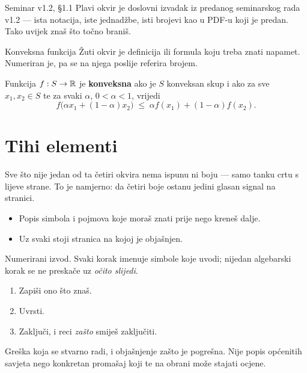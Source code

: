 \begin{seminar}{Seminar v1.2, §1.1}
Plavi okvir je doslovni izvadak iz predanog seminarskog rada v1.2 --- ista notacija,
iste jednadžbe, isti brojevi kao u PDF-u koji je predan. Tako uvijek znaš što točno
braniš.
\end{seminar}

\begin{pojam}{Konveksna funkcija}
Žuti okvir je definicija ili formula koju treba znati napamet. Numeriran je, pa se na
njega poslije referira brojem.

Funkcija $f: S \to \mathbb{R}$ je \textbf{konveksna} ako je $S$ konveksan skup i ako za sve
$x_1, x_2 \in S$ te za svaki $\alpha$, $0 < \alpha < 1$, vrijedi
\begin{equation}
f\bigl(\alpha x_1 + (1-\alpha) x_2\bigr) \;\leq\; \alpha f(x_1) + (1-\alpha) f(x_2).
\end{equation}
\end{pojam}

\section{Tihi elementi}

Sve što nije jedan od ta četiri okvira nema ispunu ni boju --- samo tanku crtu s lijeve
strane. To je namjerno: da četiri boje ostanu jedini glasan signal na stranici.

\begin{predznanje}
\begin{itemize}[nosep,leftmargin=*]
  \item Popis simbola i pojmova koje moraš znati prije nego kreneš dalje.
  \item Uz svaki stoji stranica na kojoj je objašnjen.
\end{itemize}
\end{predznanje}

\begin{korak}
Numerirani izvod. Svaki korak imenuje simbole koje uvodi; nijedan algebarski korak se
ne preskače uz \emph{očito slijedi}.
\begin{enumerate}[nosep,leftmargin=*]
  \item Zapiši ono što znaš.
  \item Uvrsti.
  \item Zaključi, i reci \emph{zašto} smiješ zaključiti.
\end{enumerate}
\end{korak}

\begin{zamka}
Greška koja se stvarno radi, i objašnjenje zašto je pogrešna. Nije popis općenitih
savjeta nego konkretan promašaj koji te na obrani može stajati ocjene.
\end{zamka}

